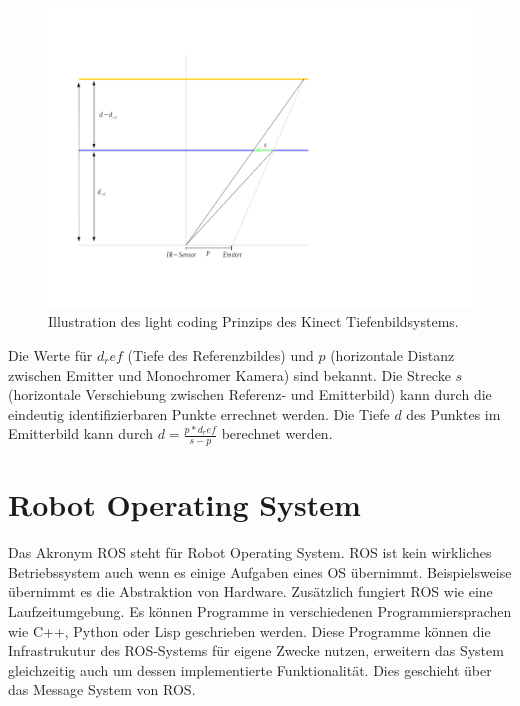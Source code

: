 			\begin{figure}[H]
			\centering
			\includegraphics[width=1.2\linewidth]{../media/kinect-depth-principle}
			\caption{Illustration des light coding Prinzips des Kinect Tiefenbildsystems.}
			\label{fig:kinect-depth-principle}
			\end{figure}
			Die Werte für $d_ref$ (Tiefe des Referenzbildes) und $p$ (horizontale Distanz zwischen Emitter und Monochromer Kamera) sind bekannt. Die Strecke $s$ (horizontale Verschiebung zwischen Referenz- und Emitterbild) kann durch die eindeutig identifizierbaren Punkte errechnet werden. Die Tiefe $d$ des Punktes im Emitterbild kann durch $d = \frac{p*d_ref}{s-p}$ berechnet werden.\\
			\cite{kinect-uug-chem}

			

	\section{Robot Operating System}
	Das Akronym ROS steht für Robot Operating System. ROS ist kein wirkliches Betriebssystem auch wenn es einige Aufgaben eines OS übernimmt. Beispielsweise übernimmt es die Abstraktion von Hardware. Zusätzlich fungiert ROS wie eine Laufzeitumgebung. Es können Programme in verschiedenen Programmiersprachen wie C++, Python oder Lisp geschrieben werden. Diese Programme können die Infrastrukutur des ROS-Systems für eigene Zwecke nutzen, erweitern das System gleichzeitig auch um dessen implementierte Funktionalität. Dies geschieht über das Message System von ROS.\newline \cite{ros-intro}

